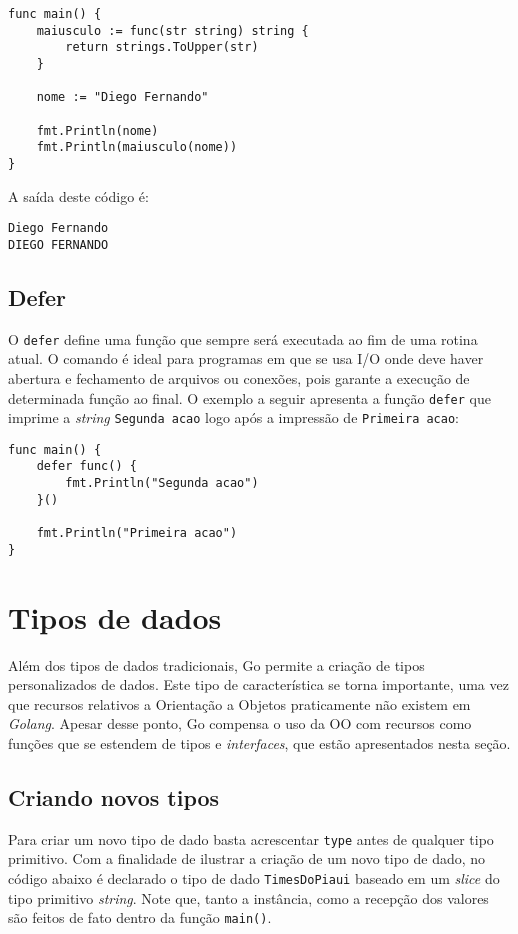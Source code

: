 \documentclass{SBCbookchapter}
\begin{document}
\begin{lstlisting}
func main() {
	maiusculo := func(str string) string {
		return strings.ToUpper(str)
	}
	
	nome := "Diego Fernando"
	
	fmt.Println(nome)
	fmt.Println(maiusculo(nome))
}
\end{lstlisting}

A saída deste código é:

\noindent\texttt{Diego Fernando}\\
\texttt{DIEGO FERNANDO}\\

\subsection{Defer}
\label{defer}

O \texttt{defer} define uma função que sempre será executada ao fim de uma rotina atual. O comando é ideal para programas em que se usa I/O onde deve haver abertura e fechamento de arquivos ou conexões, pois garante a execução de determinada função ao final. O exemplo a seguir apresenta a função \texttt{defer} que imprime a \textit{string} \texttt{Segunda acao} logo após a impressão de \texttt{Primeira acao}:

\begin{lstlisting}
func main() {
	defer func() {
		fmt.Println("Segunda acao")
	}()
	
	fmt.Println("Primeira acao")
}
\end{lstlisting}

\section{Tipos de dados}
	
Além dos tipos de dados tradicionais, Go permite a criação de tipos personalizados de dados. Este tipo de característica se torna importante, uma vez que recursos relativos a Orientação a Objetos praticamente não existem em \textit{Golang}. Apesar desse ponto, Go compensa o uso da OO com recursos como funções que se estendem de tipos e \textit{interfaces}, que estão apresentados nesta seção.
	
\subsection{Criando novos tipos}
	
Para criar um novo tipo de dado basta acrescentar \texttt{type} antes de qualquer tipo primitivo. Com a finalidade de ilustrar a criação de um novo tipo de dado, no código abaixo é declarado o tipo de dado \texttt{TimesDoPiaui} baseado em um \textit{slice} do tipo primitivo \textit{string}. Note que, tanto a instância, como a recepção dos valores são feitos de fato dentro da função \texttt{main()}.
	
\end{document}
